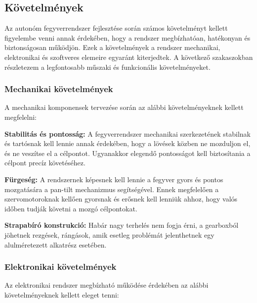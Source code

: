 \documentclass[12pt,a4paper]{article}
\begin{document}
\subsection{Követelmények}\label{sec:kov}


Az autonóm fegyverrendszer fejlesztése során számos követelményt kellett figyelembe venni annak érdekében, hogy a rendszer megbízhatóan, hatékonyan és biztonságosan működjön. Ezek a követelmények a rendszer mechanikai, elektronikai és szoftveres elemeire egyaránt kiterjedtek. A következő szakaszokban részletezem a legfontosabb műszaki és funkcionális követelményeket.

\subsubsection*{Mechanikai követelmények} 

A mechanikai komponensek tervezése során az alábbi követelményeknek kellett megfelelni:
\begin{list}{}{}
	\item \textbf{Stabilitás és pontosság:}  A fegyverrendszer mechanikai szerkezetének stabilnak és tartósnak kell lennie annak érdekében, hogy a lövések közben ne mozduljon el, és ne veszítse el a célpontot. Ugyanakkor elegendő pontosságot kell biztosítania a célpont precíz követéséhez.
	\item \textbf{Fürgeség:} A rendszernek képesnek kell lennie a fegyver gyors és pontos mozgatására a pan-tilt mechanizmus segítségével. Ennek megfelelően a szervomotoroknak kellően gyorsnak és erősnek kell lenniük ahhoz, hogy valós időben tudják követni a mozgó célpontokat.
	\item \textbf{Strapabíró konstrukció:} Habár nagy terhelés nem fogja érni, a gearboxból jöhetnek rezgések, rángások, amik esetleg problémát jelenthetnek egy alulméretezett alkatrész esetében.
\end{list}

\subsubsection*{Elektronikai követelmények}

Az elektronikai rendszer megbízható működése érdekében az alábbi követelményeknek kellett eleget tenni:
\end{document}
